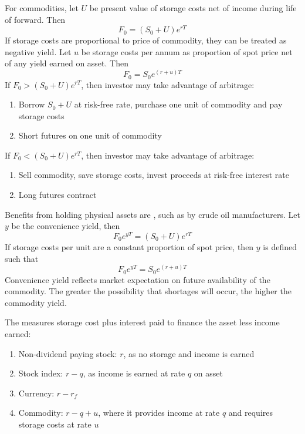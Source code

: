 For commodities, let $U$ be present value of storage costs net of income during life of forward. Then
\begin{equation*}
F_0 = (S_0 + U)e^{rT} \nonumber
\end{equation*}
If storage costs are proportional to price of commodity, they can be treated as negative yield. Let $u$ be storage costs per annum as proportion of spot price net of any yield earned on asset. Then
\begin{equation*}
F_0 = S_0 e^{(r+u)T} \nonumber
\end{equation*}
If $F_0 > (S_0 + U)e^{rT}$, then investor may take advantage of arbitrage:
\begin{enumerate}[label=\arabic*.]
\setlength{\itemsep}{0pt}
\item Borrow $S_0 + U$ at risk-free rate, purchase one unit of commodity and pay storage costs
\item Short futures on one unit of commodity
\end{enumerate}
If $F_0 < (S_0 + U)e^{rT}$, then investor may take advantage of arbitrage:
\begin{enumerate}[label=\arabic*.]
\setlength{\itemsep}{0pt}
\item Sell commodity, save storage costs, invest proceeds at risk-free interest rate
\item Long futures contract
\end{enumerate}

Benefits from holding physical assets are , such as by crude oil manufacturers. Let $y$ be the convenience yield, then
\begin{equation*}
F_0 e^{yT} = (S_0 + U)e^{rT} \nonumber
\end{equation*}
If storage costs per unit are a constant proportion of spot price, then $y$ is defined such that
\begin{equation*}
F_0 e^{yT} = S_0 e^{(r+u)T} \nonumber
\end{equation*}
Convenience yield reflects market expectation on future availability of the commodity. The greater the possibility that shortages will occur, the higher the commodity yield.

The  measures storage cost plus interest paid to finance the asset less income earned:
\begin{enumerate}[label=\roman*.]
\setlength{\itemsep}{0pt}
\item Non-dividend paying stock: $r$, as no storage and income is earned
\item Stock index: $r-q$, as income is earned at rate $q$ on asset
\item Currency: $r - r_f$
\item Commodity: $r-q+u$, where it provides income at rate $q$ and requires storage costs at rate $u$
\end{enumerate}

